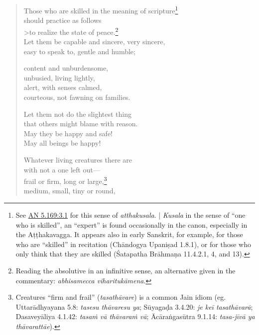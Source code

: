 \documentclass[12pt,openany]{book}%
\begin{document}
\begin{verse}%
Those who are skilled in the meaning of scripture\footnote{See \href{https://suttacentral.net/an5.169/en/sujato\#3.1}{AN 5.169:3.1} for this sense of \textit{atthakusala}. | \textit{Kusala} in the sense of “one who is skilled”, an “expert” is found occasionally in the canon, especially in the \textsanskrit{Aṭṭhakavagga}. It appears also in early Sanskrit, for example, for those who are “skilled” in recitation (\textsanskrit{Chāndogya} \textsanskrit{Upaniṣad} 1.8.1), or for those who only think that they are skilled (Śatapatha \textsanskrit{Brāhmaṇa} 11.4.2.1, 4, and 13). } \\
should practice as follows \\>to realize the state of peace.\footnote{Reading the absolutive in an infinitive sense, an alternative given in the commentary: \textit{abhisamecca \textsanskrit{viharitukāmena}}. } \\
Let them be capable and sincere, very sincere, \\
easy to speak to, gentle and humble; 

content and unburdensome, \\
unbusied, living lightly, \\
alert, with senses calmed, \\
courteous, not fawning on families. 

Let them not do the slightest thing \\
that others might blame with reason. \\
May they be happy and safe! \\
May all beings be happy! 

Whatever living creatures there are \\
with not a one left out—\\
frail or firm, long or large,\footnote{Creatures “firm and frail” (\textit{\textsanskrit{tasathāvare}}) is a common Jain idiom (eg. \textsanskrit{Uttarādhyayana} 5.8: \textit{tasesu \textsanskrit{thāvaresu} ya}; \textsanskrit{Sūyagaḍa} 3.4.20: \textit{je \textsanskrit{keī} \textsanskrit{tasathāvarā}}; \textsanskrit{Dasaveyāliya} 4.1.42: \textit{\textsanskrit{tasaṁ} \textsanskrit{vā} \textsanskrit{thāvaraṁ} \textsanskrit{vā}}; \textsanskrit{Ācāraṅgasūtra} 9.1.14: \textit{tasa-\textsanskrit{jīvā} ya \textsanskrit{thāvarattāe}}). } \\
medium, small, tiny or round, 


\end{verse}
\end{document}
